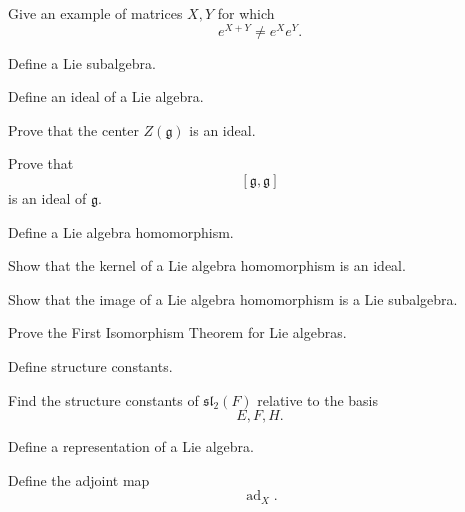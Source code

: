 \begin{exercise}[2]
Give an example of matrices \(X,Y\) for which
\[ e^{X+Y}\neq e^Xe^Y. \]
\end{exercise}

\begin{exercise}[1]
Define a Lie subalgebra.
\end{exercise}

\begin{exercise}[1]
Define an ideal of a Lie algebra.
\end{exercise}

\begin{exercise}[2]
Prove that the center \(Z(\mathfrak g)\) is an ideal.
\end{exercise}

\begin{exercise}[2]
Prove that
\[ [\mathfrak g,\mathfrak g] \]
is an ideal of \(\mathfrak g\).
\end{exercise}

\begin{exercise}[1]
Define a Lie algebra homomorphism.
\end{exercise}

\begin{exercise}[2]
Show that the kernel of a Lie algebra homomorphism is an ideal.
\end{exercise}

\begin{exercise}[2]
Show that the image of a Lie algebra homomorphism is a Lie subalgebra.
\end{exercise}

\begin{exercise}[2]
Prove the First Isomorphism Theorem for Lie algebras.
\end{exercise}

\begin{exercise}[1]
Define structure constants.
\end{exercise}

\begin{exercise}[2]
Find the structure constants of \(\mathfrak{sl}_2(F)\) relative to the basis
\[ E,F,H. \]
\end{exercise}

\begin{exercise}[1]
Define a representation of a Lie algebra.
\end{exercise}

\begin{exercise}[1]
Define the adjoint map
\[ \operatorname{ad}_X. \]
\end{exercise}

